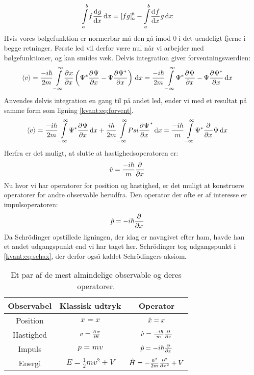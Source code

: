 \documentclass[../Kvantemekanik.tex]{subfiles}
\begin{document}
$$
\integral{f\dif{x}{g}}{x}{a}{b} = [fg]_a^b -\integral{\dif{x}{f}g}{x}{a}{b}
$$
Hvis vores bølgefunktion er normerbar må den gå imod 0 i det uendeligt fjerne i begge retninger. Første led vil derfor være nul når vi arbejder med bølgefunktioner, og kan smides væk. 
Delvis integration giver forventningsværdien:
$$
\expect v = \frac{-i\hbar}{2m}\integral{\pdif{x}{x}
\left(\Psi^*\pdif{x}{\Psi}-\Psi\pdif{x}{\Psi^*}\right)
}{x}{-\infty}{\infty}=
\frac{-i\hbar}{2m}\integral{
\Psi^*\pdif{x}{\Psi}-\Psi\pdif{x}{\Psi^*}
}{x}{-\infty}{\infty}
$$
Anvendes delvis integration en gang til på andet led, ender vi med et resultat på samme form som ligning \eqref{kvant:eq:forvent}.
$$
\expect v = \frac{-i\hbar}{2m}\integral{\Psi^*\pdif{x}\Psi}{x}{-\infty}{\infty}+\frac{i\hbar}{2m}\integral{Psi\pdif{x}\Psi^*}{x}{-\infty}{\infty} = \frac{-i\hbar}{m}\integral{\Psi^*\pdif{x}{}\Psi}{x}{-\infty}{\infty}
$$
Herfra er det muligt, at slutte at hastighedsoperatoren er:
\begin{equation}
\op v = \frac{-i\hbar}{m}\pdif{x}{}
\end{equation}
Nu hvor vi har operatorer for position og hastighed, er det muligt at konstruere operatorer for andre observable herudfra. Den operator der ofte er af interesse er impulsoperatoren:
\begin{equation} \label{kvant:eq:schax}
    \op p = -i\hbar \pdif{x}{}
\end{equation}
Da Schrödinger opstillede ligningen, der idag er navngivet efter ham, havde han et andet udgangspunkt end vi har taget her. Schrödinger tog udgangspunkt i \eqref{kvant:eq:schax}, der derfor også kaldet Schrödingers aksiom.
\begin{table}[h!]
\center
\begin{tabular}{c|c|c}
Observabel & Klassisk udtryk & Operator \\\hline
Position & $x=x$ & $\op x = x$\\
Hastighed & $v = \pdif{t}{x}$ & $\op v = \frac{-i\hbar}{m}\pdif{x}{}$\\
Impuls & $p = mv$ & $\op p = -i\hbar\pdif{x}{}$\\
Energi & $E=\frac{1}{2}mv^2+V$ & $\op H = -\frac{\hbar^2}{2m}\pdif[2]{x}{}+V$
\end{tabular}
\caption{Et par af de mest almindelige observable og deres operatorer.} \label{tab:operatorer_i_kvant}
\end{table}
\end{document}
